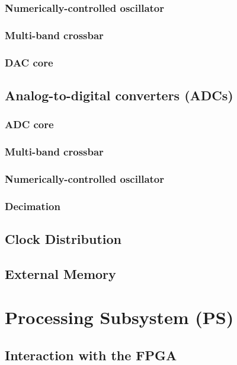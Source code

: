 \subsubsection{Numerically-controlled oscillator}

\subsubsection{Multi-band crossbar}

\subsubsection{DAC core}

\subsection{Analog-to-digital converters (ADCs)}

\subsubsection{ADC core}

\subsubsection{Multi-band crossbar}

\subsubsection{Numerically-controlled oscillator}

\subsubsection{Decimation}

\subsection{Clock Distribution}

\subsection{External Memory}

\section{Processing Subsystem (PS)}

\subsection{Interaction with the FPGA}